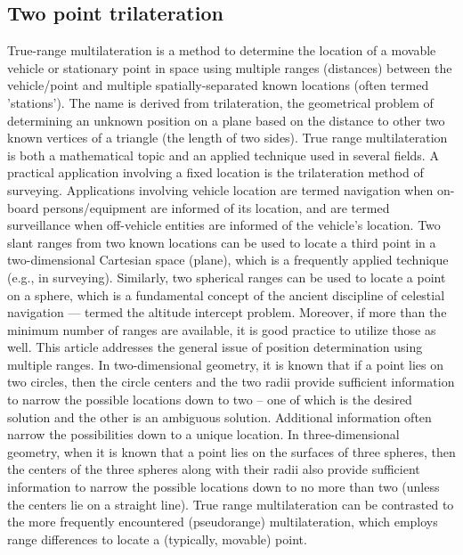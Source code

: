 \subsection{Two point trilateration}
True-range multilateration is a method to determine the location of a movable vehicle or
stationary point in space using multiple ranges (distances) between the vehicle/point and 
multiple spatially-separated known locations (often termed 'stations'). 
The name is derived from trilateration, the geometrical problem of determining an unknown 
position on a plane based on the distance to other two known vertices of a triangle 
(the length of two sides). 
True range multilateration is both a mathematical topic and an applied technique used in several
fields. 
A practical application involving a fixed location is the trilateration method of surveying.
Applications involving vehicle location are termed navigation when on-board persons/equipment are 
informed of its location, and are termed surveillance when off-vehicle entities are informed of 
the vehicle's location.
Two slant ranges from two known locations can be used to locate a third point in a two-dimensional 
Cartesian space (plane), which is a frequently applied technique (e.g., in surveying). 
Similarly, two spherical ranges can be used to locate a point on a sphere, which is a fundamental 
concept of the ancient discipline of celestial navigation — termed the altitude intercept problem.
Moreover, if more than the minimum number of ranges are available, it is good practice to utilize 
those as well. This article addresses the general issue of position determination using multiple 
ranges.
In two-dimensional geometry, it is known that if a point lies on two circles, then the circle 
centers and the two radii provide sufficient information to narrow the possible locations down to 
two – one of which is the desired solution and the other is an ambiguous solution.
Additional information often narrow the possibilities down to a unique location. 
In three-dimensional geometry, when it is known that a point lies on the surfaces of three 
spheres, then the centers of the three spheres along with their radii also provide sufficient 
information to narrow the possible locations down to no more than two (unless the centers lie on 
a straight line).
True range multilateration can be contrasted to the more frequently encountered (pseudorange) 
multilateration, which employs range differences to locate a (typically, movable) point. 
